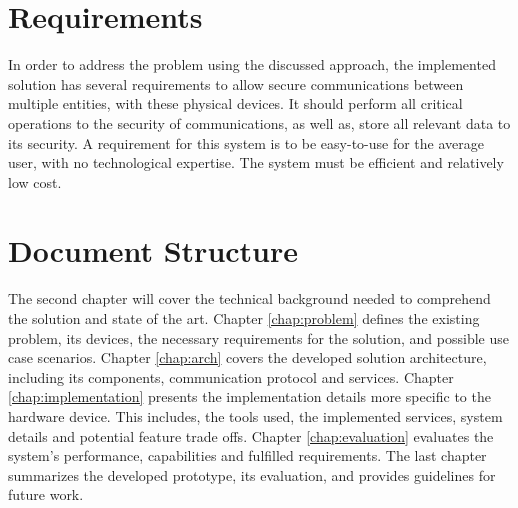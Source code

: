 \section{Requirements}\label{chap:intro:requirements}

In order to address the problem using the discussed approach, the implemented solution has several requirements to allow secure communications between multiple entities, with these physical devices.
It should perform all critical operations to the security of communications, as well as, store all relevant data to its security. A requirement for this system is to be easy-to-use for the average user, with no technological expertise. The system must be efficient and relatively low cost.

\section{Document Structure}\label{chap:intro:doc}

The second chapter will cover the technical background needed to comprehend the solution and state of the art.
Chapter \ref{chap:problem} defines the existing problem, its devices, the necessary requirements for the solution, and possible use case scenarios.
Chapter \ref{chap:arch} covers the developed solution architecture, including its components, communication protocol and services.
Chapter \ref{chap:implementation} presents the implementation details more specific to the hardware device. This includes, the tools used, the implemented services, system details and potential feature trade offs. Chapter \ref{chap:evaluation} evaluates the system's performance, capabilities and fulfilled requirements. The last chapter summarizes the developed prototype, its evaluation, and provides guidelines for future work.
